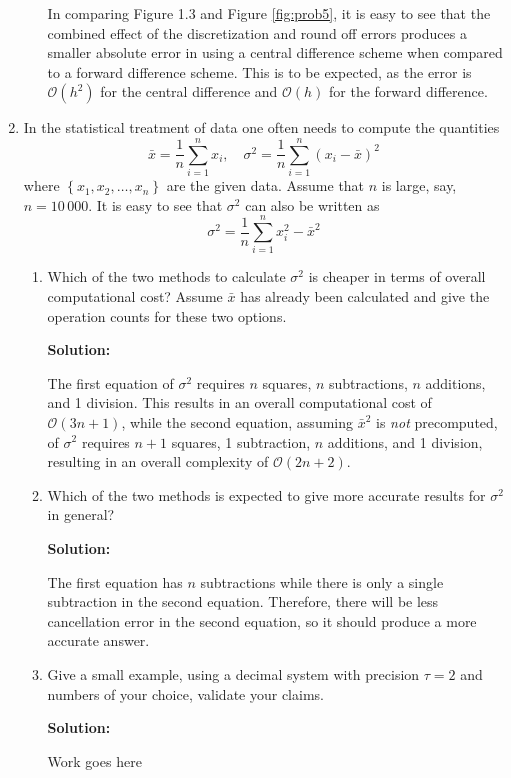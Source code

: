 \documentclass[12pt]{article}
\begin{document}
\begin{enumerate}
\begin{enumerate}
In comparing Figure 1.3 and Figure \ref{fig:prob5}, it is easy to see that the
combined effect of the discretization and round off errors produces a smaller
absolute error in using a central difference scheme when compared to a forward
difference scheme. This is to be expected, as the error is $\mathcal{O}\left(h^{2}\right)$
for the central difference and $\mathcal{O}(h)$ for the forward difference.
\end{enumerate}

\item In the statistical treatment of data one often needs to compute the quantities
\[
\bar{x} = \frac{1}{n}\sum_{i=1}^{n}x_{i},\quad \sigma^{2}=\frac{1}{n}\sum_{i=1}^{n}\left(x_{i}-\bar{x}\right)^{2}
\]
where $\left\{ x_{1}, x_{2}, \ldots, x_{n}\right\}$ are the given data. Assume that $n$
is large, say, $n = 10\,000$. It is easy to see that $\sigma^{2}$ can also be written as
\[
\sigma^{2} = \frac{1}{n}\sum_{i=1}^{n} x_{i}^{2} - \bar{x}^{2}
\]
\begin{enumerate}
\item Which of the two methods to calculate $\sigma^{2}$ is cheaper in terms of
overall computational cost? Assume $\bar{x}$ has already been calculated and give
the operation counts for these two options.

{\bf Solution:}

The first equation of $\sigma^{2}$ requires $n$ squares, $n$ subtractions, $n$ additions, and 1 division.
This results in an overall computational cost of $\mathcal{O}(3n+1)$, while the second
equation, assuming $\bar{x}^{2}$ is {\em not} precomputed,
of $\sigma^{2}$ requires $n+1$ squares, 1 subtraction, $n$ additions, and 1 division,
resulting in an overall complexity of $\mathcal{O}(2n+2)$.

\item Which of the two methods is expected to give more accurate results for
$\sigma^{2}$ in general?

{\bf Solution:}

The first equation has $n$ subtractions while there is only a single subtraction
in the second equation. Therefore, there will be less cancellation error in the
second equation, so it should produce a more accurate answer.

\item Give a small example, using a decimal system with precision $\tau = 2$ and
numbers of your choice, validate your claims.

{\bf Solution:}

Work goes here
\end{enumerate}
\end{enumerate}
\end{document}
